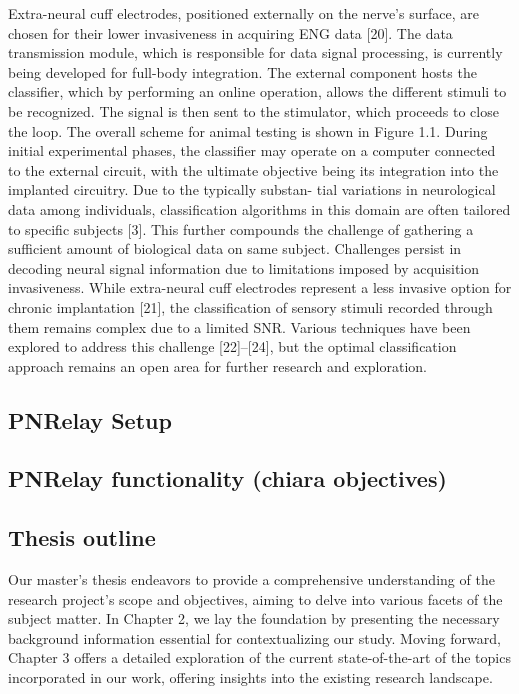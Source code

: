 \documentclass{Configuration_Files/PoliMi3i_thesis}
\begin{document}
Extra-neural cuff electrodes, positioned externally on the nerve’s surface, are chosen for their lower invasiveness in acquiring ENG data [20]. The data transmission module, which is responsible for data signal processing, is currently being developed for full-body integration. The external component hosts the classifier, which by performing an online operation, allows the different stimuli to be recognized. The signal is then sent to the stimulator, which proceeds to close the loop. The overall scheme for animal testing is shown in Figure 1.1. During initial experimental phases, the classifier may operate on a computer connected to the external circuit, with the ultimate objective being its integration into the implanted circuitry. Due to the typically substan- tial variations in neurological data among individuals, classification algorithms in this domain are often tailored to specific subjects [3]. This further compounds the challenge of gathering a sufficient amount of biological data on same subject. Challenges persist in decoding neural signal information due to limitations imposed by acquisition invasiveness. While extra-neural cuff electrodes represent a less invasive option for chronic implantation [21], the classification of sensory stimuli recorded through them remains complex due to a limited SNR. Various techniques have been explored to address this challenge [22]–[24], but the optimal classification approach remains an open area for further research and exploration.
\\
\subsection{PNRelay Setup}

\subsection{PNRelay functionality (chiara objectives)}

\subsection{Thesis outline}


Our master's thesis endeavors to provide a comprehensive understanding of the research project's scope and objectives, aiming to delve into various facets of the subject matter. In Chapter 2, we lay the foundation by presenting the necessary background information essential for contextualizing our study. Moving forward, Chapter 3 offers a detailed exploration of the current state-of-the-art of the topics incorporated in our work, offering insights into the existing research landscape.
\end{document}

